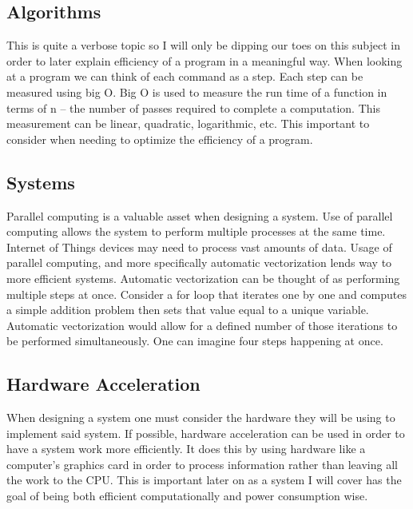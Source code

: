\documentclass{sig-alternate}
\begin{document}

\subsection{Algorithms}
\label{sec:algorithms}

This is quite a verbose topic so I will only be dipping our toes on this subject in order to later explain efficiency of a program in a meaningful way. When looking at a program we can think of each command as a step. Each step can be measured using big O. Big O is used to measure the run time of a function in terms of n -- the number of passes required to complete a computation. This measurement can be linear, quadratic, logarithmic, etc. This important to consider when needing to optimize the efficiency of a program.

\subsection{Systems}
\label{sec:systems}

Parallel computing is a valuable asset when designing a system. Use of parallel computing allows the system to perform multiple processes at the same time. Internet of Things devices may need to process vast amounts of data. Usage of parallel computing, and more specifically automatic vectorization lends way to more efficient systems. Automatic vectorization can be thought of as performing multiple steps at once. Consider a for loop that iterates one by one and computes a simple addition problem then sets that value equal to a unique variable. Automatic vectorization would allow for a defined number of those iterations to be performed simultaneously. One can imagine four steps happening at once.

\subsection{Hardware Acceleration}
\label{sec:acceleration}

When designing a system one must consider the hardware they will be using to implement said system. If possible, hardware acceleration can be used in order to have a system work more efficiently. It does this by using hardware like a computer's graphics card in order to process information rather than leaving all the work to the CPU. This is important later on as a system I will cover has the goal of being both efficient computationally and power consumption wise.
\end{document}
